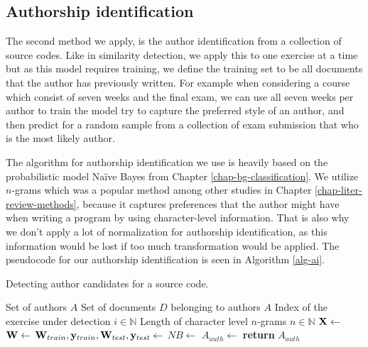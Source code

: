 \subsection{Authorship identification}

The second method we apply, is the author identification from a collection of source codes. Like in similarity detection, we apply this to one exercise at a time but as this model requires training, we define the training set to be all documents that the author has previously written. For example when considering a course which consist of seven weeks and the final exam, we can use all seven weeks per author to train the model \ie try to capture the preferred style of an author, and then predict for a random sample from a collection of exam submission that who is the most likely author.  

The algorithm for authorship identification we use is heavily based on the probabilistic model Naïve Bayes from Chapter \ref{chap-bg-classification}. We utilize $n$-grams which was a popular method among other studies in Chapter \ref{chap-liter-review-methods}, because it captures preferences that the author might have when writing a program by using character-level information. That is also why we don't apply a lot of normalization for authorship identification, as this information would be lost if too much transformation would be applied. The pseudocode for our authorship identification is seen in Algorithm \ref{alg-ai}.


\begin{algorithm}[ht]
\caption{Detecting author candidates for a source code.}
\label{alg-ai}
\begin{algorithmic}

\Require Set of authors $A$
\Require Set of documents $D$ belonging to authors $A$
\Require Index of the exercise under detection $i \in \mathbb{N}$
\Require Length of character level $n$-grams $n \in \mathbb{N}$
   \State $\mathbf{X} \gets$ 
   \State $\mathbf{W} \gets$ 
   \State $\mathbf{W}_{train}, \mathbf{y}_{train}, \mathbf{W}_{test}, \mathbf{y}_{test} \gets$ 
   \State $NB \gets$ 
   \State $A_{auth} \gets$ 
   \State \textbf{return} $A_{auth}$
\EndProcedure
\end{algorithmic}
\end{algorithm}

